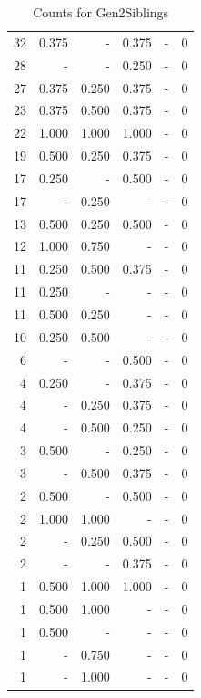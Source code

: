 \documentclass[a4paper]{article}\usepackage[]{graphicx}\usepackage[]{color}
\begin{document}
\begin{table}[ht]
\begin{tabular}{rrrrrr}
   \rowcolor{sosoColor} 32 & 0.375 & - & 0.375 & - & 0 \\ 
   \rowcolor{sosoColor} 28 & - & - & 0.250 & - & 0 \\ 
  27 & 0.375 & 0.250 & 0.375 & - & 0 \\ 
  23 & 0.375 & 0.500 & 0.375 & - & 0 \\ 
   \rowcolor{goodColor} 22 & 1.000 & 1.000 & 1.000 & - & 0 \\ 
  19 & 0.500 & 0.250 & 0.375 & - & 0 \\ 
   \rowcolor{sosoColor} 17 & 0.250 & - & 0.500 & - & 0 \\ 
  17 & - & 0.250 & - & - & 0 \\ 
   \rowcolor{badColor} 13 & 0.500 & 0.250 & 0.500 & - & 0 \\ 
  12 & 1.000 & 0.750 & - & - & 0 \\ 
  11 & 0.250 & 0.500 & 0.375 & - & 0 \\ 
   \rowcolor{nullColor} 11 & 0.250 & - & - & - & 0 \\ 
  11 & 0.500 & 0.250 & - & - & 0 \\ 
  10 & 0.250 & 0.500 & - & - & 0 \\ 
   \rowcolor{sosoColor} 6 & - & - & 0.500 & - & 0 \\ 
   \rowcolor{sosoColor} 4 & 0.250 & - & 0.375 & - & 0 \\ 
  4 & - & 0.250 & 0.375 & - & 0 \\ 
   \rowcolor{badColor} 4 & - & 0.500 & 0.250 & - & 0 \\ 
   \rowcolor{sosoColor} 3 & 0.500 & - & 0.250 & - & 0 \\ 
  3 & - & 0.500 & 0.375 & - & 0 \\ 
   \rowcolor{sosoColor} 2 & 0.500 & - & 0.500 & - & 0 \\ 
  2 & 1.000 & 1.000 & - & - & 0 \\ 
   \rowcolor{badColor} 2 & - & 0.250 & 0.500 & - & 0 \\ 
   \rowcolor{sosoColor} 2 & - & - & 0.375 & - & 0 \\ 
   \rowcolor{goodColor} 1 & 0.500 & 1.000 & 1.000 & - & 0 \\ 
  1 & 0.500 & 1.000 & - & - & 0 \\ 
   \rowcolor{nullColor} 1 & 0.500 & - & - & - & 0 \\ 
  1 & - & 0.750 & - & - & 0 \\ 
  1 & - & 1.000 & - & - & 0 \\ 
   \hline
\end{tabular}
\caption{Counts for Gen2Siblings} 
\end{table}
\end{document}
